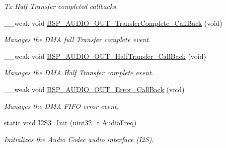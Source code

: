\begin{DoxyCompactItemize}
\begin{DoxyCompactList}\small\item\em Tx Half Transfer completed callbacks. \end{DoxyCompactList}\item 
\mbox{\label{group___s_t_m32_f4___d_i_s_c_o_v_e_r_y___a_u_d_i_o___o_u_t___private___functions_gaf7ceb1ce884743eca48891ae255db74b}} 
\+\_\+\+\_\+weak void \mbox{\hyperlink{group___s_t_m32_f4___d_i_s_c_o_v_e_r_y___a_u_d_i_o___o_u_t___private___functions_gaf7ceb1ce884743eca48891ae255db74b}{B\+S\+P\+\_\+\+A\+U\+D\+I\+O\+\_\+\+O\+U\+T\+\_\+\+Transfer\+Complete\+\_\+\+Call\+Back}} (void)
\begin{DoxyCompactList}\small\item\em Manages the D\+MA full Transfer complete event. \end{DoxyCompactList}\item 
\mbox{\label{group___s_t_m32_f4___d_i_s_c_o_v_e_r_y___a_u_d_i_o___o_u_t___private___functions_ga7c6ef28402c2ebe4ab512e4e5147b559}} 
\+\_\+\+\_\+weak void \mbox{\hyperlink{group___s_t_m32_f4___d_i_s_c_o_v_e_r_y___a_u_d_i_o___o_u_t___private___functions_ga7c6ef28402c2ebe4ab512e4e5147b559}{B\+S\+P\+\_\+\+A\+U\+D\+I\+O\+\_\+\+O\+U\+T\+\_\+\+Half\+Transfer\+\_\+\+Call\+Back}} (void)
\begin{DoxyCompactList}\small\item\em Manages the D\+MA Half Transfer complete event. \end{DoxyCompactList}\item 
\mbox{\label{group___s_t_m32_f4___d_i_s_c_o_v_e_r_y___a_u_d_i_o___o_u_t___private___functions_gaefcdc4b08ef3624bde86a2ce034201bb}} 
\+\_\+\+\_\+weak void \mbox{\hyperlink{group___s_t_m32_f4___d_i_s_c_o_v_e_r_y___a_u_d_i_o___o_u_t___private___functions_gaefcdc4b08ef3624bde86a2ce034201bb}{B\+S\+P\+\_\+\+A\+U\+D\+I\+O\+\_\+\+O\+U\+T\+\_\+\+Error\+\_\+\+Call\+Back}} (void)
\begin{DoxyCompactList}\small\item\em Manages the D\+MA F\+I\+FO error event. \end{DoxyCompactList}\item 
static void \mbox{\hyperlink{group___s_t_m32_f4___d_i_s_c_o_v_e_r_y___a_u_d_i_o___o_u_t___private___functions_ga0d2acde9244d0d7b938dc22ec689884d}{I2\+S3\+\_\+\+Init}} (uint32\+\_\+t Audio\+Freq)
\begin{DoxyCompactList}\small\item\em Initializes the Audio Codec audio interface (I2S). \end{DoxyCompactList}\end{DoxyCompactItemize}


